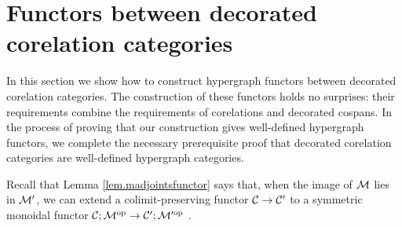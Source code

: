 
\section{Functors between decorated corelation categories} \label{sec.dcorf}
In this section we show how to construct hypergraph functors between decorated
corelation categories. The construction of these functors holds no surprises:
their requirements combine the requirements of corelations and decorated
cospans. In the process of proving that our construction gives well-defined
hypergraph functors, we complete the necessary prerequisite proof that decorated
corelation categories are well-defined hypergraph categories.

Recall that Lemma \ref{lem.madjointsfunctor} says that, when the image of $\mathcal
M$ lies in $\mathcal M'$, we can extend a colimit-preserving functor $\mathcal C \to \mathcal
C'$ to a symmetric monoidal functor $\mathcal C;\mathcal M^{\mathrm{op}} \to \mathcal C';\mathcal M'^{\mathrm{op}}$ .

